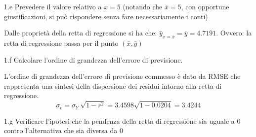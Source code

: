 \documentclass[
  11pt,
]{book}
\theoremstyle{mytheoremstyle}
\theoremstyle{mydefstyle}
\newenvironment{sol}
  {
  \begin{tcolorbox}[enhanced,breakable,arc=0.1mm,boxrule=1pt,colback=white,colframe=iblue,
  title=\bf \fontfamily{lmss}\selectfont \hspace{.5 cm} Soluzione,drop fuzzy shadow]

}{
\end{tcolorbox}
  }
\begin{document}
1.e Prevedere il valore relativo a \(x=5\)
(notando che \(\bar{x}=5\), con opportune giustificazioni, si
può rispondere senza fare necessariamente i conti)

\begin{sol}
Dalle proprietà della retta di regressione si ha che:
\(\widehat{y}_{x=\bar{x}}=\bar{y}=4.7191\).
Ovvero: la retta di regressione passa per il punto \((\bar{x},\bar{y})\)

\end{sol}

1.f Calcolare l'ordine di grandezza dell'errore di previsione.

\begin{sol}
L'ordine di grandezza dell'errore di previsione commesso è dato
da RMSE che rappresenta una sintesi della dispersione dei residui
intorno alla retta di regressione.
\begin{displaymath}
\sigma_{\epsilon} = \sigma_{Y}\ \sqrt{1-r^2} = 3.4598 \sqrt{1-0.0204}
= 3.4244
\end{displaymath}

\end{sol}

1.g Verificare
l'ipotesi che la pendenza della retta di regressione sia uguale a
0 contro l'alternativa che sia diversa da 0
\end{document}
